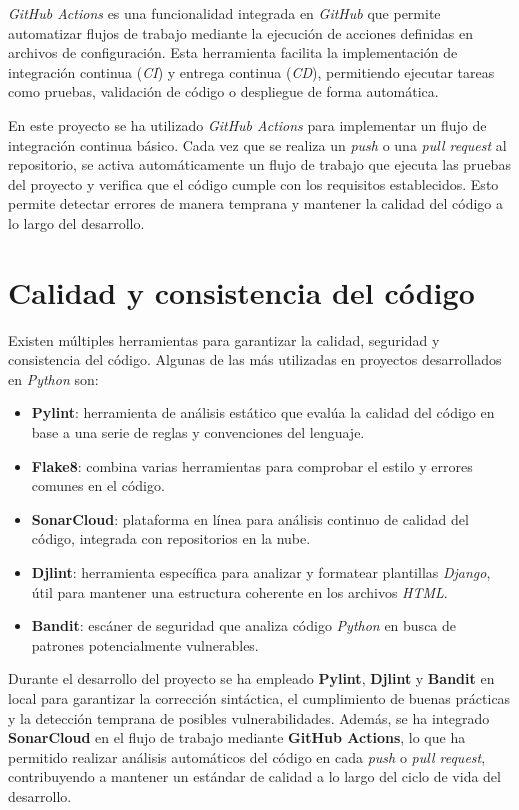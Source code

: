 \textit{GitHub Actions} es una funcionalidad integrada en \textit{GitHub} que permite automatizar flujos de trabajo mediante la ejecución de acciones 
definidas en archivos de configuración. Esta herramienta facilita la implementación de integración continua (\textit{CI}) y 
entrega continua (\textit{CD}), permitiendo ejecutar tareas como pruebas, validación de código o despliegue de forma automática.

En este proyecto se ha utilizado \textit{GitHub Actions} para implementar un flujo de integración continua básico. 
Cada vez que se realiza un \textit{push} o una \textit{pull request} al repositorio, se activa automáticamente 
un flujo de trabajo que ejecuta las pruebas del proyecto y verifica que el código cumple con los requisitos establecidos. 
Esto permite detectar errores de manera temprana y mantener la calidad del código a lo largo del desarrollo.

\section{Calidad y consistencia del código}

Existen múltiples herramientas para garantizar la calidad, seguridad y consistencia del código. 
Algunas de las más utilizadas en proyectos desarrollados en \textit{Python} son:

\begin{itemize}
    \item \textbf{Pylint}: herramienta de análisis estático que evalúa la calidad del código en base a una serie de reglas y convenciones del lenguaje.
    \item \textbf{Flake8}: combina varias herramientas para comprobar el estilo y errores comunes en el código.
    \item \textbf{SonarCloud}: plataforma en línea para análisis continuo de calidad del código, integrada con repositorios en la nube.
    \item \textbf{Djlint}: herramienta específica para analizar y formatear plantillas \textit{Django}, útil para mantener una estructura coherente en los archivos \textit{HTML}.
    \item \textbf{Bandit}: escáner de seguridad que analiza código \textit{Python} en busca de patrones potencialmente vulnerables.
\end{itemize}

Durante el desarrollo del proyecto se ha empleado \textbf{Pylint}, \textbf{Djlint} y \textbf{Bandit} en local para garantizar 
la corrección sintáctica, el cumplimiento de buenas prácticas y la detección temprana de posibles vulnerabilidades. Además, 
se ha integrado \textbf{SonarCloud} en el flujo de trabajo mediante \textbf{GitHub Actions}, lo que ha permitido realizar 
análisis automáticos del código en cada \textit{push} o \textit{pull request}, contribuyendo a mantener un estándar de calidad 
a lo largo del ciclo de vida del desarrollo.

